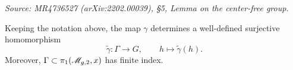 \begin{lemma}
  \label{lem:center-free-group}
  \textit{Source: MR4736527 (arXiv:2202.00039), §5, Lemma on the center-free
  group.}

  Keeping the notation above, the map \(\gamma\) determines a well-defined
  surjective homomorphism
  \[
    \widetilde{\gamma} : \Gamma \longrightarrow G, \qquad
    h \longmapsto \widetilde{\gamma}(h).
  \]
  Moreover, \(\Gamma \subset \pi_1(\mathscr{M}_{g,2}, x)\) has finite index.
\end{lemma}

